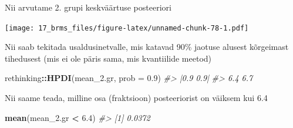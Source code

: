 \documentclass[]{book}
\newenvironment{Shaded}{\begin{snugshade}}{\end{snugshade}}
\newcommand{\CommentTok}[1]{\textcolor[rgb]{0.56,0.35,0.01}{\textit{#1}}}
\newcommand{\DataTypeTok}[1]{\textcolor[rgb]{0.13,0.29,0.53}{#1}}
\newcommand{\DecValTok}[1]{\textcolor[rgb]{0.00,0.00,0.81}{#1}}
\newcommand{\FloatTok}[1]{\textcolor[rgb]{0.00,0.00,0.81}{#1}}
\newcommand{\KeywordTok}[1]{\textcolor[rgb]{0.13,0.29,0.53}{\textbf{#1}}}
\newcommand{\NormalTok}[1]{#1}
\newcommand{\OperatorTok}[1]{\textcolor[rgb]{0.81,0.36,0.00}{\textbf{#1}}}
\newcommand{\OtherTok}[1]{\textcolor[rgb]{0.56,0.35,0.01}{#1}}
\newcommand{\StringTok}[1]{\textcolor[rgb]{0.31,0.60,0.02}{#1}}
\begin{document}
Nii arvutame 2. grupi keskväärtuse posteeriori

\begin{Shaded}
\end{Shaded}

\texttt{[image: 17\_brms\_files/figure-latex/unnamed-chunk-78-1.pdf]}

Nii saab tekitada usaldusinetvalle, mis katavad 90\% jaotuse alusest kõrgeimast tihedusest (mis ei ole päris sama, mis kvantiilide meetod)

\begin{Shaded}
\begin{Highlighting}[]
\NormalTok{rethinking}\OperatorTok{::}\KeywordTok{HPDI}\NormalTok{(mean_}\FloatTok{2.}\NormalTok{gr, }\DataTypeTok{prob =} \FloatTok{0.9}\NormalTok{)}
\CommentTok{#> |0.9 0.9| }
\CommentTok{#>  6.4  6.7}
\end{Highlighting}
\end{Shaded}

\begin{Shaded}
\end{Shaded}

Nii saame teada, milline osa (fraktsioon) posteeriorist on väiksem kui 6.4

\begin{Shaded}
\begin{Highlighting}[]
\KeywordTok{mean}\NormalTok{(mean_}\FloatTok{2.}\NormalTok{gr }\OperatorTok{<}\StringTok{ }\FloatTok{6.4}\NormalTok{)}
\CommentTok{#> [1] 0.0372}
\end{Highlighting}
\end{Shaded}
\end{document}
